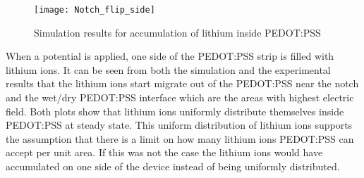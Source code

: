 \begin{doublespace}
\begin{figure}[!htp]
\centering
\texttt{[image: Notch\_flip\_side]}
\caption{Simulation results for accumulation of lithium inside PEDOT:PSS} 
\label{Notch_flip_side}
\end{figure}

When a potential is applied, one side of the PEDOT:PSS strip is filled with lithium ions. It can be seen from both the simulation and the experimental results that the lithium ions start migrate out of the PEDOT:PSS near the notch and the wet/dry PEDOT:PSS interface which are the areas with highest electric field. Both plots show that lithium ions uniformly distribute themselves inside PEDOT:PSS at steady state. This uniform distribution of lithium ions supports the assumption that there is a limit on how many lithium ions PEDOT:PSS can accept per unit area. If this was not the case the lithium ions would have accumulated on one side of the device instead of being uniformly distributed.


\end{doublespace}

